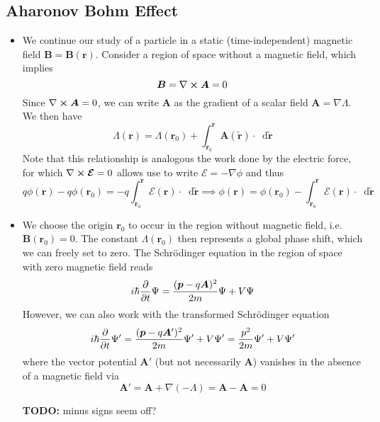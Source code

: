 \documentclass[11pt, a4paper]{article}
\newcommand{\diff}{\mathop{}\!\mathrm{d}} %
\renewcommand{\curl}{\nabla \cross}
\renewcommand{\grad}{\nabla}
\newcommand{\Schro}{Schr\"{o}dinger\xspace}
\renewcommand{\vec}[1]{\bm{#1}}  %
\renewcommand{\t}[1]{\tilde{#1}}
\renewcommand{\r}{\vec{r}}  %
\newcommand{\A}{\vec{A}}  %
\newcommand{\B}{\vec{B}}  %
\renewcommand{\P}{\Psi}  %
\begin{document}
\subsection{Aharonov Bohm Effect}
\begin{itemize}
	\item We continue our study of a particle in a static (time-independent) magnetic field $ \B = \B(\r) $. Consider a region of space without a magnetic field, which implies
	\begin{equation*}
		\B = \curl \A = 0
	\end{equation*} 
	Since $ \curl \A = 0 $, we can write $ \A $ as the gradient of a scalar field $ \A = \grad \Lambda $. We then have
	\begin{equation*}
		\Lambda(\r) = \Lambda(\r_{0}) + \int_{\r_{0}}^{\r}\A(\t{\r})\cdot \diff \t{\r}
	\end{equation*}
	Note that this relationship is analogous the work done by the electric force, for which $ \curl \vec{\mathcal{E}} = 0 $ allows use to write $ \vec{\mathcal{E}} = - \grad \phi $ and thus
	\begin{equation*}
		q\phi(\r) - q\phi(\r_{0}) = - q\int_{\r_{0}}^{\r} \vec{\mathcal{E}}(\r) \cdot \diff \t{\r} \implies \phi(\r) = \phi(\r_{0})  - \int_{\r_{0}}^{\r} \vec{\mathcal{E}}(\r) \cdot \diff \t{\r} 
	\end{equation*}
	
	\item We choose the origin $ \r_{0} $ to occur in the region without magnetic field, i.e. $ \B(\r_{0}) = 0 $. The constant $ \Lambda(\r_{0}) $ then represents a global phase shift, which we can freely set to zero. The \Schro equation in the region of space with zero magnetic field reads
	\begin{equation*}
		i\hbar \pdv{t}\P = \frac{(\vec{p} - q \A)^{2}}{2m} \P + V\P
	\end{equation*}
	However, we can also work with the transformed \Schro equation
	\begin{equation*}
		i\hbar \pdv{t}\P' = \frac{(\vec{p} - q \A')^{2}}{2m} \P' + V\P' = \frac{p^{2}}{2m}\P' + V\P'
	\end{equation*}
	where the vector potential $ \A' $ (but not necessarily $ \A $) vanishes in the absence of a magnetic field via
	\begin{equation*}
		\A' = \A + \grad(-\Lambda) = \A - \A = 0
	\end{equation*}
	
	\textbf{TODO:} minus signs seem off?
	

\end{itemize}
\end{document}
